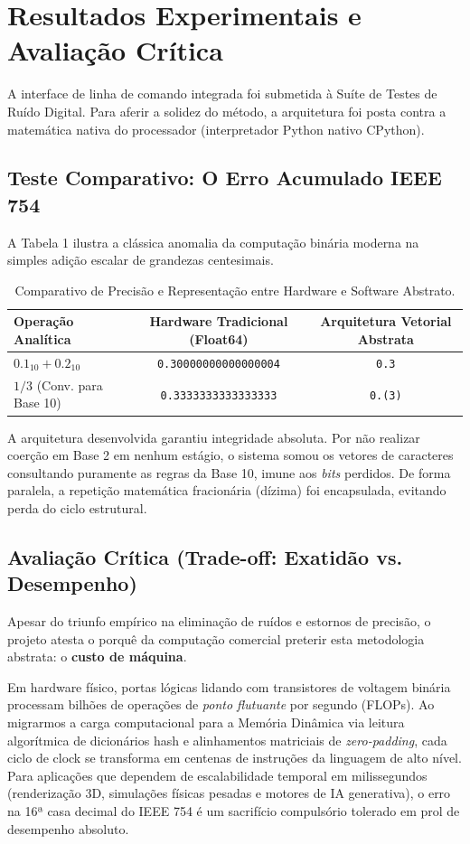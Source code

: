 \documentclass[12pt,a4paper]{article}
\begin{document}
\section{Resultados Experimentais e Avaliação Crítica}

A interface de linha de comando integrada foi submetida à Suíte de Testes de Ruído Digital. Para aferir a solidez do método, a arquitetura foi posta contra a matemática nativa do processador (interpretador Python nativo CPython).

\subsection{Teste Comparativo: O Erro Acumulado IEEE 754}
A Tabela 1 ilustra a clássica anomalia da computação binária moderna na simples adição escalar de grandezas centesimais.

\begin{table}[h]
\centering
\begin{tabular}{@{}lcc@{}}
\toprule
\textbf{Operação Analítica} & \textbf{Hardware Tradicional (Float64)} & \textbf{Arquitetura Vetorial Abstrata} \\ \midrule
$0.1_{10} + 0.2_{10}$ & \texttt{0.30000000000000004} & \texttt{0.3} \\
$1/3$ (Conv. para Base 10) & \texttt{0.3333333333333333} & \texttt{0.(3)} \\ \bottomrule
\end{tabular}
\caption{Comparativo de Precisão e Representação entre Hardware e Software Abstrato.}
\label{tab:comparativo}
\end{table}

A arquitetura desenvolvida garantiu integridade absoluta. Por não realizar coerção em Base 2 em nenhum estágio, o sistema somou os vetores de caracteres consultando puramente as regras da Base 10, imune aos \textit{bits} perdidos. De forma paralela, a repetição matemática fracionária (dízima) foi encapsulada, evitando perda do ciclo estrutural.

\subsection{Avaliação Crítica (Trade-off: Exatidão vs. Desempenho)}
Apesar do triunfo empírico na eliminação de ruídos e estornos de precisão, o projeto atesta o porquê da computação comercial preterir esta metodologia abstrata: o \textbf{custo de máquina}.

Em hardware físico, portas lógicas lidando com transistores de voltagem binária processam bilhões de operações de \textit{ponto flutuante} por segundo (FLOPs). Ao migrarmos a carga computacional para a Memória Dinâmica via leitura algorítmica de dicionários hash e alinhamentos matriciais de \textit{zero-padding}, cada ciclo de clock se transforma em centenas de instruções da linguagem de alto nível. Para aplicações que dependem de escalabilidade temporal em milissegundos (renderização 3D, simulações físicas pesadas e motores de IA generativa), o erro na 16ª casa decimal do IEEE 754 é um sacrifício compulsório tolerado em prol de desempenho absoluto.
\end{document}
